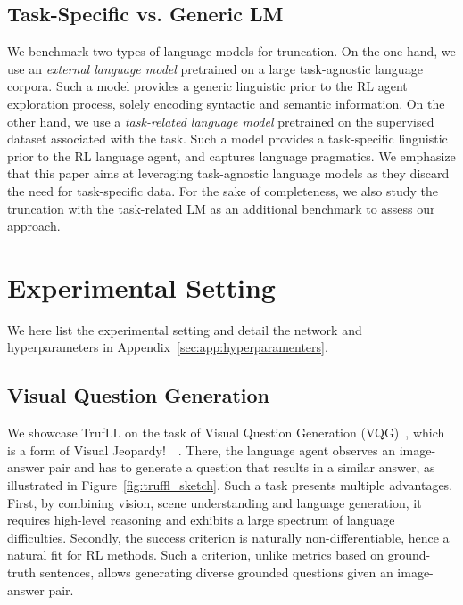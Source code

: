 \documentclass{article}
\newcommand{\algo}{TrufLL\xspace}
\begin{document}
\subsection{Task-Specific vs. Generic LM}
\label{subsec:trunc:LM}
We benchmark two types of language models for truncation. 
On the one hand, we use an \textit{external language model} pretrained on a large task-agnostic language corpora. Such a model provides a generic linguistic prior to the RL agent exploration process, solely encoding syntactic and semantic information. 
On the other hand, we use a \textit{task-related language model} pretrained on the supervised dataset associated with the task. Such a model provides a task-specific linguistic prior to the RL language agent, 
and captures language pragmatics. 
We emphasize that this paper aims at leveraging task-agnostic language models as they discard the need for task-specific data. For the sake of completeness, we also study the truncation with the task-related LM as an additional benchmark to assess our approach.

\section{Experimental Setting}
\label{sec:experiments}

We here list the experimental setting and detail the network and hyperparameters in Appendix~\ref{sec:app:hyperparamenters}.

\subsection{Visual Question Generation} 
\label{subsec:exp:VQG}

We showcase \algo on the task of Visual Question Generation (VQG)~\citep{mostafazadeh2016generating}, which is a form of Visual Jeopardy!~\texttrademark~\citep{ferrucci2012introduction}.
There, the language agent observes an image-answer pair and has to generate a question that results in a similar answer, as illustrated in  Figure~\ref{fig:truffl_sketch}. Such a task presents multiple advantages. First, by combining vision, scene understanding and language generation, it requires high-level reasoning and exhibits a large spectrum of language difficulties. Secondly, the success criterion is naturally non-differentiable, hence a natural fit for RL methods. Such a criterion, unlike metrics based on ground-truth sentences, allows generating diverse grounded questions given an image-answer pair.
\end{document}
